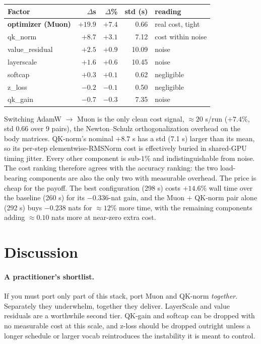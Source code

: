 \documentclass[11pt]{article}
\begin{document}
\begin{table}[h]
\centering
\small
\begin{tabular}{@{}lRRRl@{}}
\toprule
\textbf{Factor} & \textbf{$\Delta$s} & \textbf{$\Delta$\%} & \textbf{std (s)} & \textbf{reading} \\
\midrule
\textbf{optimizer (Muon)} & $+19.9$ & $+7.4$ & 0.66 & real cost, tight \\
qk\_norm                  & $+8.7$  & $+3.1$ & 7.12 & cost within noise \\
value\_residual           & $+2.5$  & $+0.9$ & 10.09 & noise \\
layerscale                & $+1.6$  & $+0.6$ & 10.45 & noise \\
softcap                   & $+0.3$  & $+0.1$ & 0.62 & negligible \\
z\_loss                   & $-0.2$  & $-0.1$ & 0.50 & negligible \\
qk\_gain                  & $-0.7$  & $-0.3$ & 7.35 & noise \\
\bottomrule
\end{tabular}
\end{table}

Switching AdamW $\to$ Muon is the only clean cost signal, ${\approx}20$ s/run
($+7.4\%$, std 0.66 over 9 pairs), the Newton--Schulz orthogonalization overhead
on the body matrices. QK-norm's nominal $+8.7$ s has a std (7.1 s) larger than
its mean, so its per-step elementwise-RMSNorm cost is effectively buried in
shared-GPU timing jitter. Every other component is sub-$1\%$ and indistinguishable
from noise. The cost ranking therefore agrees with the accuracy ranking: the two
load-bearing components are also the only two with measurable overhead. The price
is cheap for the payoff. The best configuration (298 s) costs $+14.6\%$ wall time
over the baseline (260 s) for its $-0.336$-nat gain, and the Muon $+$ QK-norm pair
alone (292 s) buys $-0.238$ nats for ${\approx}12\%$ more time, with the remaining
components adding ${\approx}0.10$ nats more at near-zero extra cost.

\section{Discussion}

\paragraph{A practitioner's shortlist.} If you must port only part of this
stack, port Muon and QK-norm \emph{together}. Separately they underwhelm,
together they deliver. LayerScale and value residuals are a worthwhile second
tier. QK-gain and softcap can be dropped with no measurable cost at this scale,
and z-loss should be dropped outright unless a longer schedule or larger vocab
reintroduces the instability it is meant to control.
\end{document}
